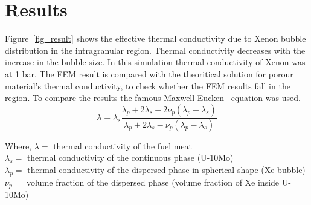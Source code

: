 \section{Results}
\begin{doublespacing}
\iffalse
In this study, heat conduction simulations were used to study the impact of overall heat transfer coefficient in the presence of Xenon bubble in the intragranular and intergranular region. Grain boundary resistance and the influence of intergranular fission is not included in this calculation. This simulation is design to see the impact on heat transfer due to the formation of Gas Bubble Superlattice. Bubble superlattice formation inside U-Mo fuel stabilizes the fuel swelling behavior but heavily impacts the heat transfer capability~\cite{burkes2015thermal}. This might be due to Xenon's very low thermal conductivity. Thermal properties of Xenon was also considered in this work. Xenon's thermal conductivity is a function of both temperature and pressure~\cite{rabinovich1987thermophysical}. Since the size of the bubble changes with the burnup and fission density, thermal conductivity of the bubble also changes~\cite{miller2012advantages}. Pressure inside the bubble is highly depend on the curvature of the bubble. The reults is plotted in figure~\ref{fig_result}. As it can be seen from the plot that thermal conductivity of U-10Mo drops with the presence of the Xenon bubble. And with the increase of the Xenon bubble's size it also decreases. The result is also compared with Maxwell-Eucken equation~\cite{maxwell1881treatise} and with Hashin and Strikman~\cite{hashin1962variational}. In figure~\ref{fig_compare} the comparison is showed. 
\fi

Figure~\ref{fig_result} shows the effective thermal conductivity due to Xenon bubble distribution in the intragranular region. Thermal conductivity decreases with the increase in the bubble size. In this simulation thermal conductivity of Xenon was at 1 bar. The FEM result is compared with the theoritical solution for porour material's thermal conductivity, to check whether the FEM results fall in the region. To compare the results the famous Maxwell-Eucken~\cite{maxwell1881treatise} equation was used. 
\begin{equation}
	\label{eq_MaxEuck}
	\lambda = \lambda_s\frac{\lambda_p+2\lambda_s+2\nu_p(\lambda_p-\lambda_s)}{\lambda_p+2\lambda_s-\nu_p(\lambda_p-\lambda_s)}
\end{equation}

\noindent Where, $\lambda = $ thermal conductivity of the fuel meat \\ 
		$\lambda_s = $ thermal conductivity of the continuous phase (U-10Mo) \\
		$\lambda_p = $ thermal conductivity of the dispersed phase in spherical shape (Xe bubble) \\
		$\nu_p = $ volume fraction of the dispersed phase (volume fraction of Xe inside U-10Mo) \\


\end{doublespacing}
